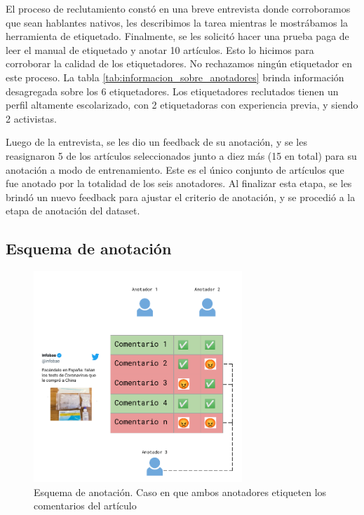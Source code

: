 El proceso de reclutamiento constó en una breve entrevista donde corroboramos que sean hablantes nativos, les describimos la tarea mientras le mostrábamos la herramienta de etiquetado. Finalmente, se les solicitó hacer una prueba paga de leer el manual de etiquetado y anotar 10 artículos. Esto lo hicimos para corroborar la calidad de los etiquetadores. No rechazamos ningún etiquetador en este proceso. La tabla \ref{tab:informacion_sobre_anotadores} brinda información desagregada sobre los 6 etiquetadores. Los etiquetadores reclutados tienen un perfil altamente escolarizado, con 2 etiquetadoras con experiencia previa, y siendo 2 activistas.

Luego de la entrevista, se les dio un feedback de su anotación, y se les reasignaron 5 de los artículos seleccionados junto a diez más (15 en total) para su anotación a modo de entrenamiento. Este es el único conjunto de artículos que fue anotado por la totalidad de los seis anotadores. Al finalizar esta etapa, se les brindó un nuevo feedback para ajustar el criterio de anotación, y se procedió a la etapa de anotación del dataset.

\subsection{Esquema de anotación}



\begin{figure}
    \centering
    \includegraphics[width=0.7\textwidth]{img/esquema_anotacion.pdf}
    \caption{Esquema de anotación. Caso en que ambos anotadores etiqueten los comentarios del artículo}
    \label{fig:annotation_schema}
\end{figure}

